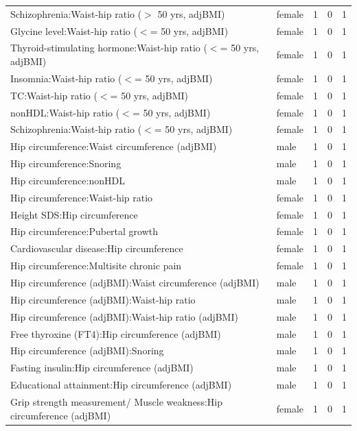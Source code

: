 \begin{table}[ht]
\begin{tabular}{llrrr}
  Schizophrenia:Waist-hip ratio ($>$ 50 yrs, adjBMI) & female &   1 &   0 &   1 \\ 
  Glycine level:Waist-hip ratio ($<$= 50 yrs, adjBMI) & female &   1 &   0 &   1 \\ 
  Thyroid-stimulating hormone:Waist-hip ratio ($<$= 50 yrs, adjBMI) & female &   1 &   0 &   1 \\ 
  Insomnia:Waist-hip ratio ($<$= 50 yrs, adjBMI) & female &   1 &   0 &   1 \\ 
  TC:Waist-hip ratio ($<$= 50 yrs, adjBMI) & female &   1 &   0 &   1 \\ 
  nonHDL:Waist-hip ratio ($<$= 50 yrs, adjBMI) & female &   1 &   0 &   1 \\ 
  Schizophrenia:Waist-hip ratio ($<$= 50 yrs, adjBMI) & female &   1 &   0 &   1 \\ 
  Hip circumference:Waist circumference (adjBMI) & male &   1 &   0 &   1 \\ 
  Hip circumference:Snoring & male &   1 &   0 &   1 \\ 
  Hip circumference:nonHDL & male &   1 &   0 &   1 \\ 
  Hip circumference:Waist-hip ratio & female &   1 &   0 &   1 \\ 
  Height SDS:Hip circumference & female &   1 &   0 &   1 \\ 
  Hip circumference:Pubertal growth & female &   1 &   0 &   1 \\ 
  Cardiovascular disease:Hip circumference & female &   1 &   0 &   1 \\ 
  Hip circumference:Multisite chronic pain & female &   1 &   0 &   1 \\ 
  Hip circumference (adjBMI):Waist circumference (adjBMI) & male &   1 &   0 &   1 \\ 
  Hip circumference (adjBMI):Waist-hip ratio & male &   1 &   0 &   1 \\ 
  Hip circumference (adjBMI):Waist-hip ratio (adjBMI) & male &   1 &   0 &   1 \\ 
  Free thyroxine (FT4):Hip circumference (adjBMI) & male &   1 &   0 &   1 \\ 
  Hip circumference (adjBMI):Snoring & male &   1 &   0 &   1 \\ 
  Fasting insulin:Hip circumference (adjBMI) & male &   1 &   0 &   1 \\ 
  Educational attainment:Hip circumference (adjBMI) & male &   1 &   0 &   1 \\ 
  Grip strength measurement/ Muscle weakness:Hip circumference (adjBMI) & female &   1 &   0 &   1 \\ 

\end{tabular}
\end{table}
